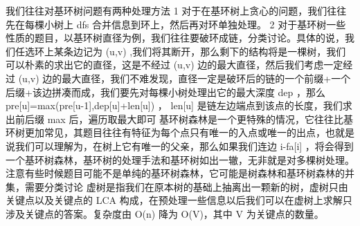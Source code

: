 {}我们往往对基环树问题有两种处理方法\markdownRendererParagraphSeparator
{}\markdownRendererDollarSign{} 1 \markdownRendererDollarSign{} 对于在基环树上贪心的问题，我们往往先在每棵小树上\markdownRendererDollarSign{} dfs \markdownRendererDollarSign{}合并信息到环上，然后再对环单独处理。\markdownRendererParagraphSeparator
{}\markdownRendererDollarSign{} 2 \markdownRendererDollarSign{}对于基环树一些性质的题目，以基环树直径为例，我们往往要破环成链，分类讨论。具体的说，我们任选环上某条边记为\markdownRendererDollarSign{} (u,v) \markdownRendererDollarSign{},我们将其断开，那么剩下的结构将是一棵树，我们可以朴素的求出它的直径，这是不经过\markdownRendererDollarSign{} (u,v) \markdownRendererDollarSign{}边的最大直径，然后我们考虑一定经过\markdownRendererDollarSign{} (u,v) \markdownRendererDollarSign{}边的最大直径，我们不难发现，直径一定是破环后的链的一个前缀+一个后缀+该边拼凑而成，我们要先对每棵小树处理出它的最大深度\markdownRendererDollarSign{} dep \markdownRendererDollarSign{}，那么\markdownRendererDollarSign{} pre[u]=max(pre[u-1],dep[u]+len[u]) \markdownRendererDollarSign{}，\markdownRendererDollarSign{} len[u] \markdownRendererDollarSign{}是链左边端点到该点的长度，我们求出前后缀\markdownRendererDollarSign{} max \markdownRendererDollarSign{}后，遍历取最大即可\markdownRendererInterblockSeparator
{}\markdownRendererSectionBegin
{}\markdownRendererInterblockSeparator
{}\markdownRendererInterblockSeparator
{}基环树森林是一个更特殊的情况，它往往比基环树更加常见，其题目往往有特征为每个点只有唯一的入点或唯一的出点，也就是说我们可以理解为，在树上它有唯一的父亲，那么如果我们连边\markdownRendererDollarSign{} i-fa[i] \markdownRendererDollarSign{}，将会得到一个基环树森林，基环树的处理手法和基环树如出一辙，无非就是对多棵树处理。\markdownRendererParagraphSeparator
{}注意有些时候题目可能不是单纯的基环树森林，它可能是树森林和基环树森林的并集，需要分类讨论\markdownRendererInterblockSeparator
{}
\markdownRendererSectionEnd \markdownRendererSectionBegin
{}\markdownRendererInterblockSeparator
{}\markdownRendererInterblockSeparator
{}
\markdownRendererSectionEnd 
\markdownRendererSectionEnd \markdownRendererSectionBegin
{}\markdownRendererInterblockSeparator
{}虚树是指我们在原本树的基础上抽离出一颗新的树，虚树只由关键点以及关键点的 \markdownRendererDollarSign{}LCA\markdownRendererDollarSign{} 构成，在预处理一些信息以后我们可以在虚树上求解只涉及关键点的答案。复杂度由 \markdownRendererDollarSign{}O(n)\markdownRendererDollarSign{} 降为 \markdownRendererDollarSign{}O(V)\markdownRendererDollarSign{}，其中 \markdownRendererDollarSign{}V\markdownRendererDollarSign{} 为关键点的数量。\markdownRendererParagraphSeparator
